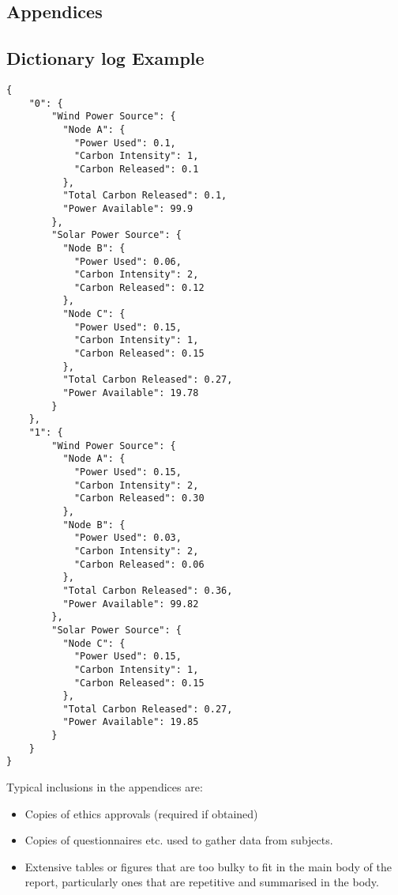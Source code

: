 \documentclass{l4proj}
\begin{document}
\begin{appendices}
\chapter{Appendices}

\section{Dictionary log Example}
\begin{lstlisting}[caption={Example dictionary structure used by the power domain.},label={lst:dic-log}]
{
    "0": {
        "Wind Power Source": {
          "Node A": {
            "Power Used": 0.1,
            "Carbon Intensity": 1,
            "Carbon Released": 0.1
          },
          "Total Carbon Released": 0.1,
          "Power Available": 99.9
        },
        "Solar Power Source": {
          "Node B": {
            "Power Used": 0.06,
            "Carbon Intensity": 2,
            "Carbon Released": 0.12
          },
          "Node C": {
            "Power Used": 0.15,
            "Carbon Intensity": 1,
            "Carbon Released": 0.15
          },
          "Total Carbon Released": 0.27,
          "Power Available": 19.78
        }
    },
    "1": {
        "Wind Power Source": {
          "Node A": {
            "Power Used": 0.15,
            "Carbon Intensity": 2,
            "Carbon Released": 0.30
          },
          "Node B": {
            "Power Used": 0.03,
            "Carbon Intensity": 2,
            "Carbon Released": 0.06
          },
          "Total Carbon Released": 0.36,
          "Power Available": 99.82
        },
        "Solar Power Source": {
          "Node C": {
            "Power Used": 0.15,
            "Carbon Intensity": 1,
            "Carbon Released": 0.15
          },
          "Total Carbon Released": 0.27,
          "Power Available": 19.85
        }
    }
}
\end{lstlisting}
Typical inclusions in the appendices are:

\begin{itemize}
\item
  Copies of ethics approvals (required if obtained)
\item
  Copies of questionnaires etc. used to gather data from subjects.
\item
  Extensive tables or figures that are too bulky to fit in the main body of
  the report, particularly ones that are repetitive and summarised in the body.


\end{itemize}
\end{appendices}
\end{document}
